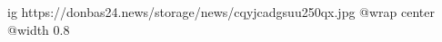  
 
 
 
 

\ifcmt
  ig https://donbas24.news/storage/news/cqyjcadgsuu250qx.jpg
  @wrap center
  @width 0.8
\fi
